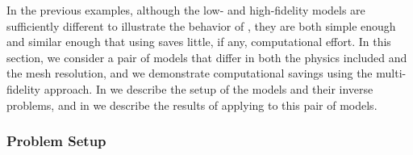\documentclass[review,sort&compress]{elsarticle}
\begin{document}
In the previous examples, although the low- and high-fidelity models are sufficiently different to illustrate the behavior of , they are both simple enough and similar enough that using  saves little, if any, computational effort. In this section, we consider a pair of models that differ in both the physics included and the mesh resolution, and we demonstrate computational savings using the multi-fidelity approach. In  we describe the setup of the models and their inverse problems, and in  we describe the results of applying  to this pair of models.

\subsubsection{Problem Setup} \label{sec:setup3D_diffmesh}
\end{document}
